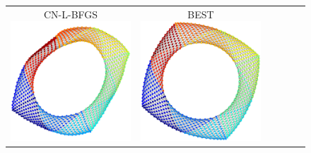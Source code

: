 \documentclass[dvipdfmx,10pt,journal,compsoc]{IEEEtran}
\begin{document}
\begin{figure}[btp]
\begin{tabular}{cccccc}
    \makecell{\small{\textsf{CN-L-BFGS}}                                                                                                                 \\[-0.2em]\includegraphics[width=0.27\columnwidth]{individual/vis/jagmesh1_CN-L-BFGS.png}} &
    \makecell{\small{\textsf{BEST}}                                                                                                                      \\[-0.2em]\includegraphics[width=0.27\columnwidth]{individual/vis/opt_jagmesh1.png}} \\


\end{tabular}
\end{figure}
\end{document}
